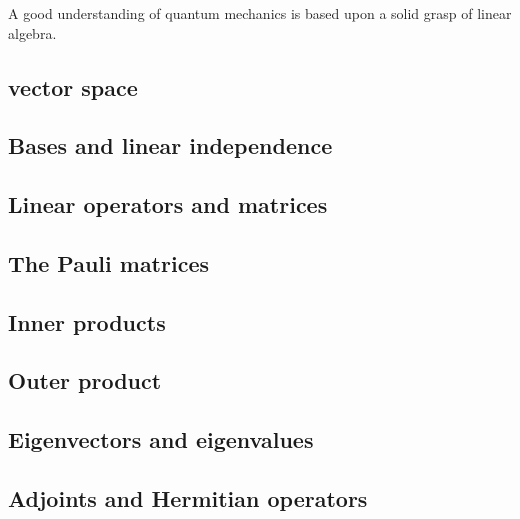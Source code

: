 \documentclass[
	11pt, %
	fleqn, %
	a4paper, %
]{LegrandOrangeBook}
\begin{document}
A good understanding of quantum mechanics is based upon a solid grasp of linear algebra.

\subsection{vector space}


\subsection{Bases and linear independence}


\subsection{Linear operators and matrices}


\subsection{The Pauli matrices}


\subsection{Inner products}


\subsection{Outer product}


\subsection{Eigenvectors and eigenvalues}


\subsection{Adjoints and Hermitian operators}

\end{document}
